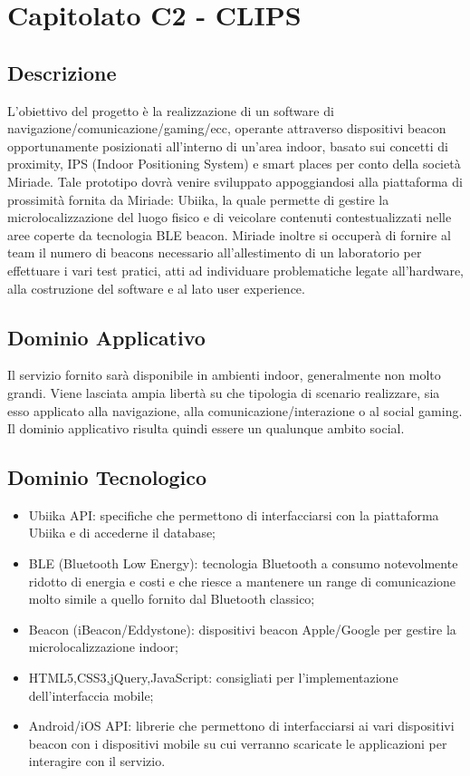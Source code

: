 \section{Capitolato C2 - CLIPS}
\subsection{Descrizione}
L'obiettivo del progetto è la realizzazione di un software di navigazione/comunicazione/gaming/ecc, operante attraverso dispositivi beacon opportunamente posizionati all'interno di un'area indoor, basato sui concetti di proximity, IPS (Indoor Positioning System) e smart places per conto della società Miriade. Tale prototipo dovrà venire sviluppato appoggiandosi alla piattaforma di prossimità fornita da Miriade: Ubiika, la quale permette di gestire la microlocalizzazione del luogo fisico e di veicolare contenuti contestualizzati nelle aree coperte da tecnologia BLE beacon. Miriade inoltre si occuperà di fornire al team il numero di beacons necessario all'allestimento di un laboratorio per effettuare i vari test pratici, atti ad individuare problematiche legate all'hardware, alla costruzione del software e al lato user experience.     

\subsection{Dominio Applicativo}
Il servizio fornito sarà disponibile in ambienti indoor, generalmente non molto grandi. Viene lasciata ampia libertà su che tipologia di scenario realizzare, sia esso applicato alla navigazione, alla comunicazione/interazione o al social gaming. Il dominio applicativo risulta quindi essere un qualunque ambito social. 

\subsection{Dominio Tecnologico}
\begin{itemize}
\item Ubiika API: specifiche che permettono di interfacciarsi con la piattaforma Ubiika e di accederne il database;
\item BLE (Bluetooth Low Energy): tecnologia Bluetooth a consumo notevolmente ridotto di energia e costi e che riesce a mantenere un range di comunicazione molto simile a quello fornito dal Bluetooth classico;
\item Beacon (iBeacon/Eddystone): dispositivi beacon Apple/Google per gestire la microlocalizzazione indoor;
\item HTML5,CSS3,jQuery,JavaScript: consigliati per l'implementazione dell'interfaccia mobile;
\item Android/iOS API: librerie che permettono di interfacciarsi ai vari dispositivi beacon con i dispositivi mobile su cui verranno scaricate le applicazioni per interagire con il servizio.
\end{itemize}

